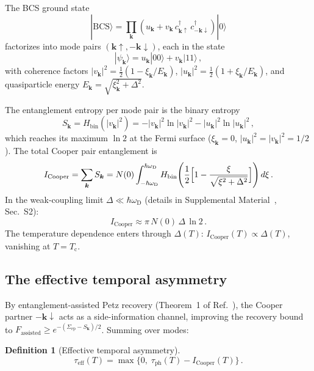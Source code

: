 \documentclass[prb,twocolumn,superscriptaddress,longbibliography,floatfix]{revtex4-2}
\newtheorem{definition}[theorem]{Definition}
\newcommand{\ket}[1]{|#1\rangle}
\newcommand{\tauasym}{\tau}
\newcommand{\taueff}{\tauasym_{\mathrm{eff}}}
\newcommand{\taudec}{\tauasym_{\mathrm{ph}}}
\newcommand{\Icoop}{I_{\mathrm{Cooper}}}
\newcommand{\Tc}{T_{\mathrm{c}}}
\newcommand{\oD}{\omega_{\mathrm{D}}}
\newcommand{\Ek}{E_{\bm{k}}}
\newcommand{\xik}{\xi_{\bm{k}}}
\begin{document}
The BCS ground state~\cite{BCS1957}
\begin{equation}\label{eq:BCS}
  \ket{\mathrm{BCS}} = \prod_{\bm{k}}
  (u_{\bm{k}} + v_{\bm{k}}\, c_{\bm{k}\uparrow}^\dagger\,
  c_{-\bm{k}\downarrow}^\dagger)\ket{0}
\end{equation}
factorizes into mode pairs $(\bm{k}\!\uparrow,
-\bm{k}\!\downarrow)$, each in the state
\begin{equation}\label{eq:pair_state}
  \ket{\psi_{\bm{k}}} = u_{\bm{k}}\ket{00} + v_{\bm{k}}\ket{11}\,,
\end{equation}
with coherence factors
$|v_{\bm{k}}|^2 = \frac{1}{2}(1 - \xik/\Ek)$,
$|u_{\bm{k}}|^2 = \frac{1}{2}(1 + \xik/\Ek)$, and
quasiparticle energy $\Ek = \sqrt{\xik^2 + \Delta^2}$.

The entanglement entropy per mode pair is the binary entropy
\begin{equation}\label{eq:S_k}
  S_{\bm{k}} = H_{\mathrm{bin}}(|v_{\bm{k}}|^2)
  = -|v_{\bm{k}}|^2 \ln|v_{\bm{k}}|^2
  - |u_{\bm{k}}|^2 \ln|u_{\bm{k}}|^2\,,
\end{equation}
which reaches its maximum $\ln 2$ at the Fermi surface
($\xik = 0$, $|u_{\bm{k}}|^2 = |v_{\bm{k}}|^2 = 1/2$).
The total Cooper pair entanglement is
\begin{equation}\label{eq:Icoop}
  \Icoop = \sum_{\bm{k}} S_{\bm{k}}
  = N(0) \int_{-\hbar\oD}^{\hbar\oD} H_{\mathrm{bin}}
  \!\left(\frac{1}{2}\Bigl[1 - \frac{\xi}{\sqrt{\xi^2+\Delta^2}}\Bigr]\right)
  d\xi\,.
\end{equation}
In the weak-coupling limit $\Delta \ll \hbar\oD$ (details in
Supplemental Material~\cite{supplement}, Sec.~S2):
\begin{equation}\label{eq:Icoop_approx}
  \Icoop \approx \pi\, N(0)\, \Delta\, \ln 2\,.
\end{equation}
The temperature dependence enters through $\Delta(T)$:
$\Icoop(T) \propto \Delta(T)$, vanishing at $T = \Tc$.

\subsection{The effective temporal asymmetry}

By entanglement-assisted Petz recovery
(Theorem~1 of Ref.~\cite{Devetak2005}), the Cooper partner
$-\bm{k}\!\downarrow$ acts as a side-information channel,
improving the recovery bound to
$F_{\mathrm{assisted}} \geq e^{-(\Sigma_{\mathrm{ep}} - S_{\bm{k}})/2}$.
Summing over modes:

\begin{definition}[Effective temporal asymmetry]
\label{def:tau_eff}
\begin{equation}\label{eq:tau_eff}
  \taueff(T) = \max\!\bigl\{0,\; \taudec(T) - \Icoop(T)\bigr\}\,.
\end{equation}
\end{definition}
\end{document}
